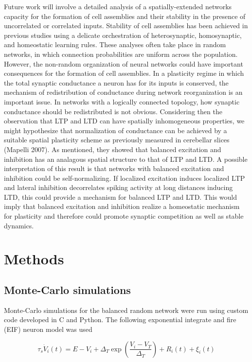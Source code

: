 \documentclass{ucetd}
\begin{document}
Future work will involve a detailed analysis of a spatially-extended networks capacity for the formation of cell assemblies and their stability in the presence of uncorrelated or correlated inputs. Stability of cell assemblies has been achieved in previous studies using a delicate orchestration of heterosynaptic, homosynaptic, and homeostatic learning rules. These analyses often take place in random networks, in which connection probabilities are uniform across the population. However, the non-random organization of neural networks could have important consequences for the formation of cell assemblies. In a plasticity regime in which the total synaptic conductance a neuron has for its inputs is conserved, the mechanism of redistribution of conductance during network reorganization is an important issue. In networks with a logically connected topology, how synaptic conductance should be redistributed is not obvious. Considering then the observation that LTP and LTD can have spatially inhomogeneous properties, we might hypothesize that normalization of conductance can be achieved by a suitable spatial plasticity scheme as previously measured in cerebellar slices (Mapelli 2007). As mentioned, they showed that balanced excitation and inhibition has an analagous spatial structure to that of LTP and LTD. A possible interpretation of this result is that networks with balanced excitation and inhibition could be self-normalizing. If localized excitation induces localized LTP and lateral inhibition decorrelates spiking activity at long distances inducing LTD, this could provide a mechanism for balanced LTP and LTD. This would imply that balanced excitation and inhibition realize a homeostatic mechanism for plasticity and therefore could promote synaptic competition as well as stable dynamics. 

\section{Methods}

\subsection{Monte-Carlo simulations}

Monte-Carlo simulations for the balanced random network were run using custom code developed in C and Python. The following exponential integrate and fire (EIF) neuron model was used

\begin{equation}
\tau_{s}\dot{V}_{i}(t) = E - V_{i} + \Delta_{T}\exp\left(\frac{V_{i}-V_{T}}{\Delta_{T}}\right) + R_{i}(t) + \xi_{i}(t)
\end{equation}
\end{document}
